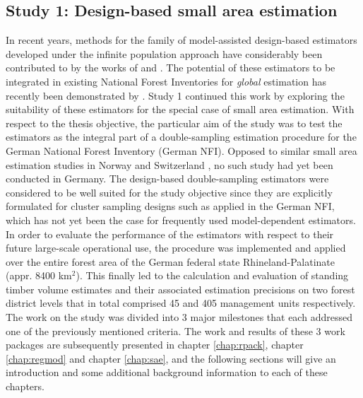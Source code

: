\subsection{Study 1: Design-based small area estimation}
\label{sec:study1}


In recent years, methods for the family of model-assisted design-based estimators developed under the infinite population approach have considerably been contributed to by the works of \citet{mandallaz1991, mandallaz2008, mandallaz2013a, mandallaz2013c} and \citet{mandallaz2013b}. The potential of these estimators to be integrated in existing National Forest Inventories for \textit{global} estimation has recently been demonstrated by \citet{massey2015_thesis}. Study 1 continued this work by exploring the suitability of these estimators for the special case of small area estimation. With respect to the thesis objective, the particular aim of the study was to test the estimators as the integral part of a double-sampling estimation procedure for the German National Forest Inventory (German NFI). Opposed to similar small area estimation studies in Norway \citep{breidenbach2012} and Switzerland \citep{magnussen2014a, steinmann2013}, no such study had yet been conducted in Germany. The design-based double-sampling estimators were considered to be well suited for the study objective since they are explicitly formulated for cluster sampling designs such as applied in the German NFI, which has not yet been the case for frequently used model-dependent estimators. In order to evaluate the performance of the estimators with respect to their future large-scale operational use, the procedure was implemented and applied over the entire forest area of the German federal state Rhineland-Palatinate (appr. 8400 km$^2$). This finally led to the calculation and evaluation of standing timber volume estimates and their associated estimation precisions on two forest district levels that in total comprised 45 and 405 management units respectively. The work on the study was divided into 3 major milestones that each addressed one of the previously mentioned criteria. The work and results of these 3 work packages are subsequently presented in chapter \ref{chap:rpack}, chapter \ref{chap:regmod} and chapter \ref{chap:sae}, and the following sections will give an introduction and some additional background information to each of these chapters.


